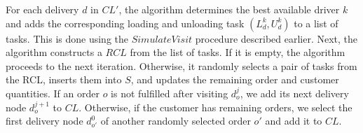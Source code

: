 \documentclass{article}
\begin{document}
For each delivery $d$ in $CL'$, the algorithm determines the best available driver $k$ and adds the corresponding loading and unloading task $(L^k_d, U^k_d)$ to a list of tasks. This is done using the $SimulateVisit$ procedure described earlier. Next, the algorithm constructs a $RCL$ from the list of tasks. If it is empty, the algorithm proceeds to the next iteration. Otherwise, it randomly selects a pair of tasks from the RCL, inserts them into $S$, and updates the remaining order and customer quantities. If an order $o$ is not fulfilled after visiting $d^j_{o}$, we add its next delivery node $d^{j+1}_{o}$ to $CL$.  Otherwise, if the customer has remaining orders, we select the first delivery node $d^{0}_{o'}$ of another randomly selected order $o'$ and add it to $CL$.

\end{document}
